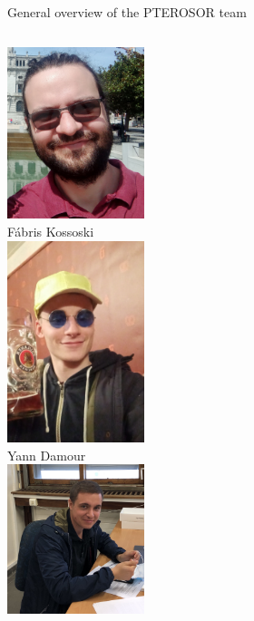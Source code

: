 \documentclass[aspectratio=169,9pt]{beamer}
\begin{document}
\begin{frame}{General overview of the PTEROSOR team}
        \centering
        \begin{columns}
                \begin{column}{0.325\textwidth}
                        \centering
                        \includegraphics[width=0.3\textwidth]{fig/Fabris_2021.png}
                        \\
                        F\'abris Kossoski
                        \\
                        \vspace{0.25cm}
                        \includegraphics[width=0.3\textwidth]{fig/Yann.jpg}
                        \\
                        Yann Damour
                        \\
                        \vspace{0.25cm}
                        \includegraphics[width=0.3\textwidth]{fig/Enzo}

\end{column}
\end{columns}
\end{frame}
\end{document}
